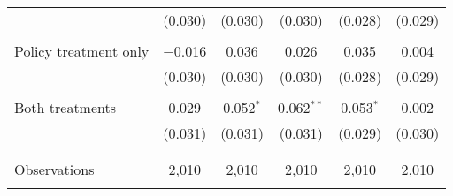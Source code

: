 \begin{tabular}{@{\extracolsep{5pt}}lccccc}
  & (0.030) & (0.030) & (0.030) & (0.028) & (0.029) \\ 
  & & & & & \\ 
 Policy treatment only & $-$0.016 & 0.036 & 0.026 & 0.035 & 0.004 \\ 
  & (0.030) & (0.030) & (0.030) & (0.028) & (0.029) \\ 
  & & & & & \\ 
 Both treatments & 0.029 & 0.052$^{*}$ & 0.062$^{**}$ & 0.053$^{*}$ & 0.002 \\ 
  & (0.031) & (0.031) & (0.031) & (0.029) & (0.030) \\ 
  & & & & & \\ 
\hline \\[-1.8ex] 

Observations & 2,010 & 2,010 & 2,010 & 2,010 & 2,010 \\ 
\hline 
\hline \\[-1.8ex] 
\end{tabular} 